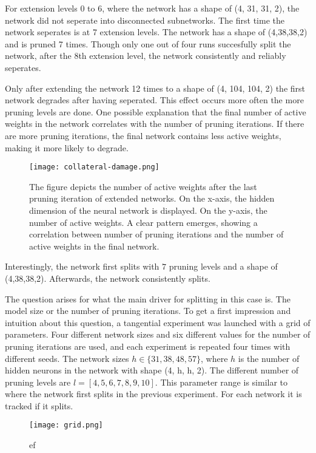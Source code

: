 For extension levels 0 to 6, where the network has a shape of (4, 31, 31, 2), the network did not seperate into disconnected subnetworks.
The first time the network seperates is at 7 extension levels. 
The network has a shape of (4,38,38,2) and is pruned 7 times.
Though only one out of four runs succesfully split the network, after the 8th extension level, the network consistently and reliably seperates.
 
Only after extending the network 12 times to a shape of (4, 104, 104, 2) the first network degrades after having seperated.
This effect occurs more often the more pruning levels are done.
One possible explanation that the final number of active weights in the network correlates with the number of pruning iterations.
If there are more pruning iterations, the final network contains less active weights, making it more likely to degrade.

\begin{figure}[ht]
    \centering
    \texttt{[image: collateral-damage.png]}
    \caption{
        The figure depicts the number of active weights after the last pruning iteration of extended networks.
        On the x-axis, the hidden dimension of the neural network is displayed.
        On the y-axis, the number of active weights.
        A clear pattern emerges, showing a correlation between number of pruning iterations and the number of active weights in the final network.
    }
    \label{fig:collateral_damage}
\end{figure}

Interestingly, the network first splits with $7$ pruning levels and a shape of (4,38,38,2).
Afterwards, the network consistently splits.

The question arises for what the main driver for splitting in this case is.
The model size or the number of pruning iterations.
To get a first impression and intuition about this question, a tangential experiment was launched with a grid of parameters.
Four different network sizes and six different values for the number of pruning iterations are used, and each experiment is repeated four times with different seeds.
The network sizes $h \in \{31, 38, 48, 57\}$, where $h$ is the number of hidden neurons in the network with shape (4, h, h, 2).
The different number of pruning levels are $l = [4, 5, 6, 7, 8, 9, 10]$.
This parameter range is similar to where the network first splits in the previous experiment.
For each network it is tracked if it splits.
\begin{figure}[ht]
    \centering
    \texttt{[image: grid.png]}
    \caption{ef}
    \label{fig:grid}
\end{figure}

